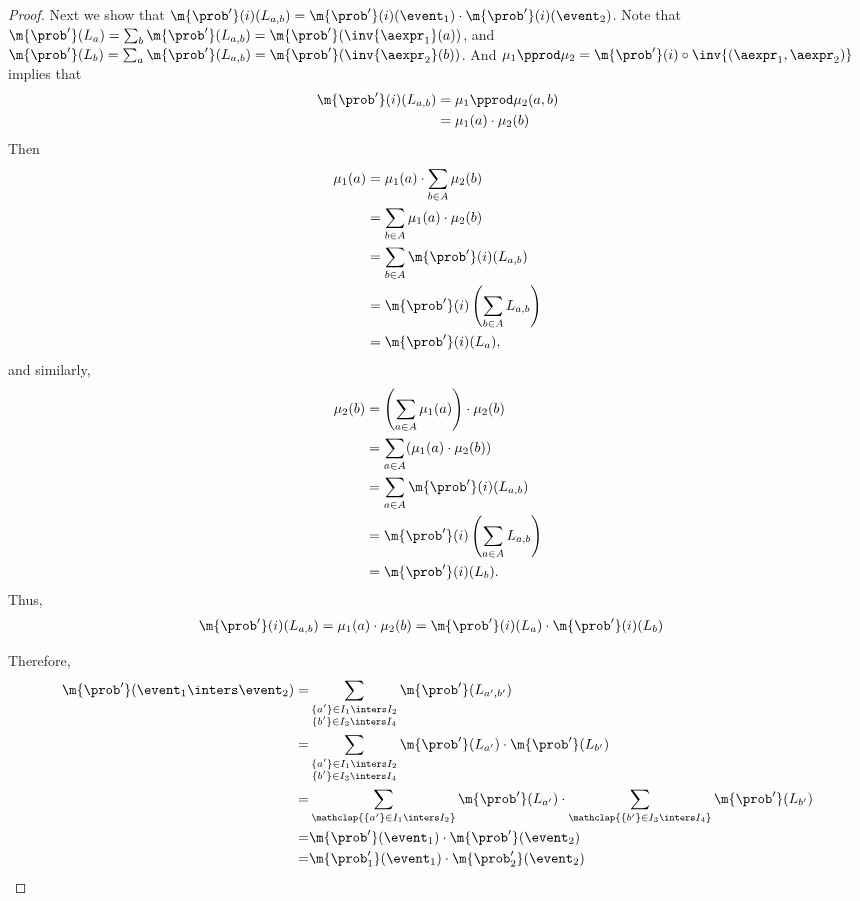 \documentclass[acmsmall,nonacm,screen,appendix]{acmart}
\begin{document}
\begin{proof}
Next we show that
       $         \m{\prob'}(i) (L_{a, b})
         = \m{\prob'}(i) (\event_1) \cdot \m{\prob'}(i) (\event_2)$.
         Note that
      $\m{\prob'}(L_a)  = \sum_{b} \m{\prob'}(L_{a,b}) = \m{\prob'}(\inv{\aexpr_1}(a))$,
      and
      $\m{\prob'}(L_b)  = \sum_{a} \m{\prob'}(L_{a,b}) = \m{\prob'}(\inv{\aexpr_2}(b))$.
      And $\mu_1 \pprod \mu_2 = \m{\prob'}(i) \circ \inv{(\aexpr_1, \aexpr_2)}$
      implies that
      \begin{align*}
        \m{\prob'}(i) (L_{a, b})
        &= \mu_1 \pprod \mu_2 (a, b)\\
        &=\mu_1(a) \cdot \mu_2(b)
      \end{align*}
      Then
      \begin{align*}
        \mu_1(a)
        &= \mu_1(a) \cdot \sum_{b \in A} \mu_2(b)\\
        &= \sum_{b \in A} \mu_1(a) \cdot \mu_2(b) \\
        &= \sum_{b \in A} \m{\prob'}(i) (L_{a, b}) \\
        &= \m{\prob'}(i) \left(\sum_{b \in A} L_{a, b}\right)  \\
        &= \m{\prob'}(i) (L_a),
      \end{align*}
      and similarly,
      \begin{align*}
        \mu_2(b)
        &= \left(\sum_{a \in A} \mu_1(a)\right) \cdot \mu_2(b)\\
        &= \sum_{a \in A} (\mu_1(a) \cdot \mu_2(b))\\
        &= \sum_{a \in A} \m{\prob'}(i) (L_{a, b}) \\
        &= \m{\prob'}(i) \left(\sum_{a \in A} L_{a, b}\right)  \\
        &= \m{\prob'}(i) (L_b).
      \end{align*}
      Thus,
      \begin{align*}
         \m{\prob'}(i) (L_{a, b})
         &=\mu_1(a) \cdot \mu_2(b)
         = \m{\prob'}(i) (L_a) \cdot \m{\prob'}(i) (L_b)
      \end{align*}



Therefore,
       \begin{align*}
         \m{\prob'}(\event_1 \inters \event_2)
         =&  \sum_{\substack{\{a'\} \in I_1 \inters I_2 \\ \{b'\} \in I_3 \inters I_4}} \m{\prob'}(L_{a', b'}) \\
         =&  \sum_{\substack{\{a'\} \in I_1 \inters I_2 \\ \{b'\} \in I_3 \inters I_4}} \m{\prob'}(L_{a'}) \cdot \m{\prob'}(L_{b'}) \\
       =&  \sum_{\mathclap{\{a'\} \in I_1 \inters I_2}}  \m{\prob'}(L_{a'}) \cdot \sum_{\mathclap{\{b'\} \in I_3 \inters I_4}} \m{\prob'}(L_{b'}) \\
       =& \m{\prob'}(\event_1) \cdot \m{\prob'}(\event_2)\\
       =& \m{\prob_1'}(\event_1) \cdot \m{\prob_2'}(\event_2)
      \end{align*}


\end{proof}
\end{document}
